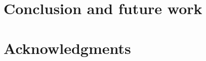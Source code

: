 \documentclass{sig-alternate-br}
\begin{document}
\section{Conclusion and future work}

\section{Acknowledgments}



%
%
\vspace{50 mm}
\newpage
\end{document}
